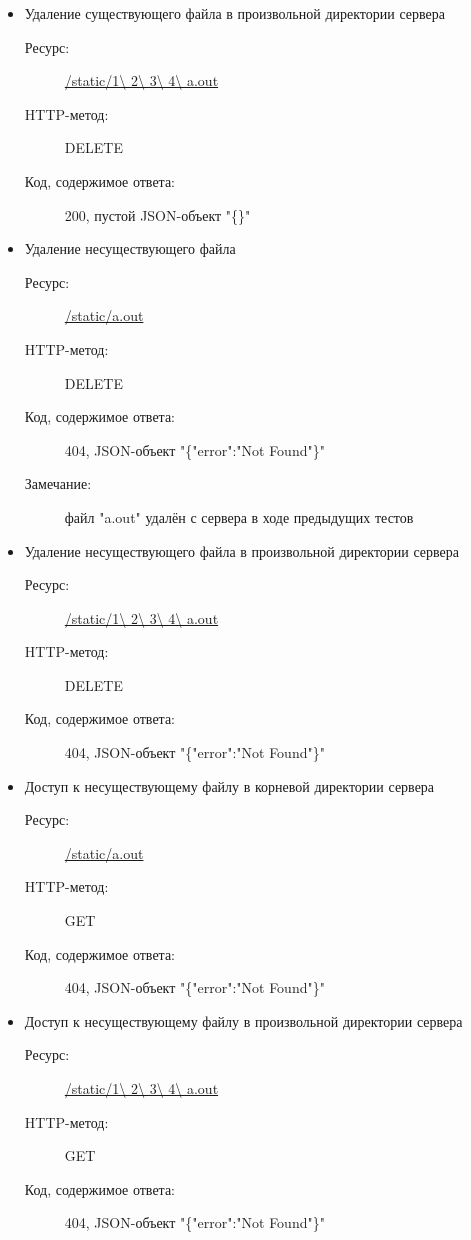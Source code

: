\documentclass[a4paper,12pt]{report}
\numberwithin{equation}{section}
\begin{document}
\begin{itemize}
  \item Удаление существующего файла в произвольной директории сервера
  \begin{description}
    \item[Ресурс:] \url{/static/1\ 2\ 3\ 4\ a.out}
    \item[HTTP-метод:] DELETE
    \item[Код, содержимое ответа:] 200, пустой JSON-объект "\{\}"
  \end{description}
  
  \item Удаление несуществующего файла
  \begin{description}
    \item[Ресурс:] \url{/static/a.out}
    \item[HTTP-метод:] DELETE
    \item[Код, содержимое ответа:] 404, JSON-объект "\{"error":"Not Found"\}"
    \item[Замечание:] файл "a.out" удалён с сервера в ходе предыдущих тестов
  \end{description}
  
  \item Удаление несуществующего файла в произвольной директории сервера
  \begin{description}
    \item[Ресурс:] \url{/static/1\ 2\ 3\ 4\ a.out}
    \item[HTTP-метод:] DELETE
    \item[Код, содержимое ответа:] 404, JSON-объект "\{"error":"Not Found"\}"
  \end{description}
  
  \item Доступ к несуществующему файлу в корневой директории сервера
  \begin{description}
    \item[Ресурс:] \url{/static/a.out}
    \item[HTTP-метод:] GET
    \item[Код, содержимое ответа:] 404, JSON-объект "\{"error":"Not Found"\}"
  \end{description}
  
  \item Доступ к несуществующему файлу в произвольной директории сервера
  \begin{description}
    \item[Ресурс:] \url{/static/1\ 2\ 3\ 4\ a.out}
    \item[HTTP-метод:] GET
    \item[Код, содержимое ответа:] 404, JSON-объект "\{"error":"Not Found"\}"
  \end{description}
\end{itemize}
\end{document}
